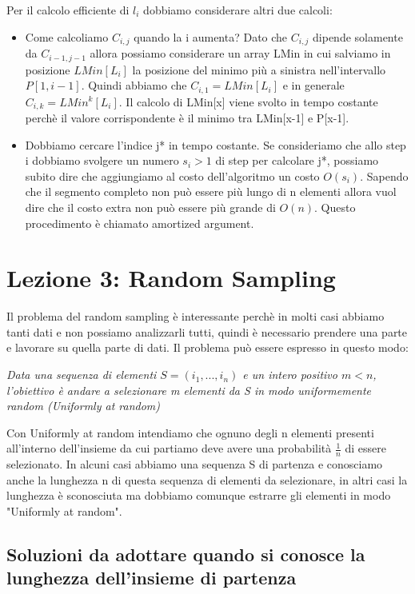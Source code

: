\documentclass[14pt]{extreport}
\begin{document}
Per il calcolo efficiente di $l_i$ dobbiamo considerare altri due calcoli:
\begin{itemize}
    \item Come calcoliamo $C_{i,j}$ quando la i aumenta? Dato che $C_{i,j}$ dipende solamente da $C_{i-1,j-1}$ allora possiamo considerare un array LMin in cui salviamo in posizione $LMin[L_i]$ la posizione del minimo più a sinistra nell'intervallo $P[1,i-1]$. 
    Quindi abbiamo che $C_{i,1} = LMin[L_i]$ e in generale $C_{i,k} = LMin^k[L_i]$.
    Il calcolo di LMin[x] viene svolto in tempo costante perchè il valore corrispondente è il minimo tra LMin[x-1] e P[x-1]. 
    \item Dobbiamo cercare l'indice j* in tempo costante. Se consideriamo che allo step i dobbiamo svolgere un numero $s_i > 1$ di step per calcolare j*, possiamo subito dire che aggiungiamo al costo dell'algoritmo un costo $O(s_i)$. Sapendo che il segmento completo non può essere più lungo di n elementi allora vuol dire che il costo extra non può essere più grande di $O(n)$. Questo procedimento è chiamato amortized argument.
\end{itemize}

\chapter{Lezione 3: Random Sampling}

Il problema del random sampling è interessante perchè in molti casi abbiamo tanti dati e non possiamo analizzarli tutti, quindi è necessario prendere una parte e lavorare su quella parte di dati.
Il problema può essere espresso in questo modo:

\textit{Data una sequenza di elementi $S=(i_1,...,i_n)$ e un intero positivo $m<n$, l'obiettivo è andare a selezionare m elementi da S in modo uniformemente random (Uniformly at random)}

Con Uniformly at random intendiamo che ognuno degli n elementi presenti all'interno dell'insieme da cui partiamo deve avere una probabilità $\frac{1}{n}$ di essere selezionato.
In alcuni casi abbiamo una sequenza S di partenza e conosciamo anche la lunghezza n di questa sequenza di elementi da selezionare, in altri casi la lunghezza è sconosciuta ma dobbiamo comunque estrarre gli elementi in modo "Uniformly at random".

\section{Soluzioni da adottare quando si conosce la lunghezza dell'insieme di partenza}
\end{document}
